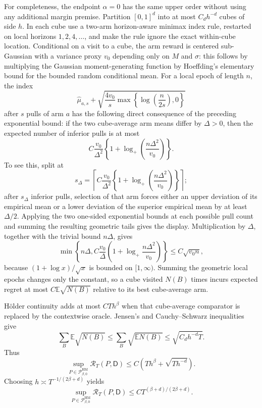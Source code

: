 For completeness, the endpoint \(\alpha=0\) has the same upper order without using any additional margin premise.  Partition \([0,1]^d\) into at most \(C_dh^{-d}\) cubes of side \(h\).  In each cube use a two-arm horizon-aware minimax index rule, restarted on local horizons \(1,2,4,\ldots\), and make the rule ignore the exact within-cube location.  Conditional on a visit to a cube, the arm reward is centered sub-Gaussian with a variance proxy \(v_0\) depending only on \(M\) and \(\sigma\): this follows by multiplying the Gaussian moment-generating function by Hoeffding's elementary bound for the bounded random conditional mean.  For a local epoch of length \(n\), the index
\[
 \widehat\mu_{a,s}
 +\sqrt{\frac{4v_0}{s}
 \max\!\left\{\log\!\left(\frac{n}{2s}\right),0\right\}}
\]
after \(s\) pulls of arm \(a\) has the following direct consequence of the preceding exponential bound: if the two cube-average arm means differ by \(\Delta>0\), then the expected number of inferior pulls is at most
\[
 C\frac{v_0}{\Delta^2}
 \left\{1+\log_+\!\left(\frac{n\Delta^2}{v_0}\right)\right\}.
\]
To see this, split at
\[
 s_\Delta=\left\lceil
 C\frac{v_0}{\Delta^2}
 \left\{1+\log_+\!\left(\frac{n\Delta^2}{v_0}\right)\right\}
 \right\rceil;
\]
after \(s_\Delta\) inferior pulls, selection of that arm forces either an upper deviation of its empirical mean or a lower deviation of the superior empirical mean by at least \(\Delta/2\).  Applying the two one-sided exponential bounds at each possible pull count and summing the resulting geometric tails gives the display.  Multiplication by \(\Delta\), together with the trivial bound \(n\Delta\), gives
\[
 \min\!\left\{n\Delta,
 C\frac{v_0}{\Delta}
 \left(1+\log_+\!\frac{n\Delta^2}{v_0}\right)\right\}
 \leq C\sqrt{v_0n},
\]
because \((1+\log x)/\sqrt{x}\) is bounded on \([1,\infty)\).  Summing the geometric local epochs changes only the constant, so a cube visited \(N(B)\) times incurs expected regret at most \(C\mathbb E\sqrt{N(B)}\) relative to its best cube-average arm.

H\"older continuity adds at most \(CTh^\beta\) when that cube-average comparator is replaced by the contextwise oracle.  Jensen's and Cauchy--Schwarz inequalities give
\[
 \sum_B\mathbb E\sqrt{N(B)}
 \leq\sum_B\sqrt{\mathbb EN(B)}
 \leq\sqrt{C_dh^{-d}T}.
\]
Thus
\[
 \sup_{P\in\mathcal P_{\beta,0}^{\mathrm{HM}}}
 \mathcal R_T(P,\mathsf D)
 \leq C\left(Th^\beta+\sqrt{Th^{-d}}\right).
\]
Choosing \(h\asymp T^{-1/(2\beta+d)}\) yields
\[
 \sup_{P\in\mathcal P_{\beta,0}^{\mathrm{HM}}}
 \mathcal R_T(P,\mathsf D)
 \leq CT^{(\beta+d)/(2\beta+d)}.
\]

